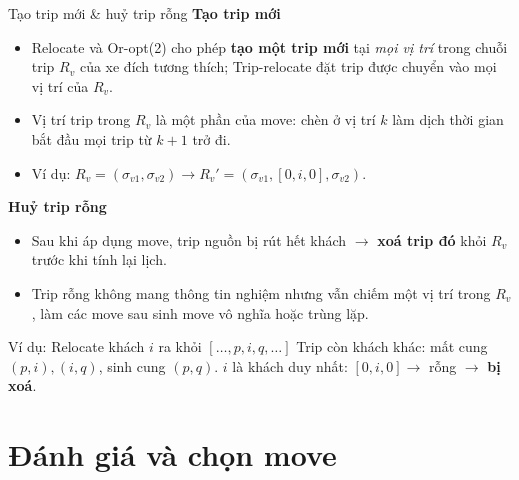\documentclass[aspectratio=169]{beamer}
\newcommand{\hl}[1]{\textcolor{blue!60!black}{\textbf{#1}}}
\begin{document}
\begin{frame}{Tạo trip mới \& huỷ trip rỗng}
  \small
  \textbf{Tạo trip mới}
  \begin{itemize}
    \item Relocate và Or-opt(2) cho phép \hl{tạo một trip mới} tại \emph{mọi vị trí} trong chuỗi trip $R_v$ của xe đích tương thích; Trip-relocate đặt trip được chuyển vào mọi vị trí của $R_v$.
    \item Vị trí trip trong $R_v$ là một phần của move: chèn ở vị trí $k$ làm dịch thời gian bắt đầu mọi trip từ $k{+}1$ trở đi.
    \item Ví dụ: $R_v = (\sigma_{v1}, \sigma_{v2}) \to R_v' = (\sigma_{v1}, [0,i,0], \sigma_{v2})$.
  \end{itemize}

  \vspace{1mm}
  \textbf{Huỷ trip rỗng}
  \begin{itemize}
    \item Sau khi áp dụng move, trip nguồn bị rút hết khách $\to$ \hl{xoá trip đó} khỏi $R_v$ trước khi tính lại lịch.
    \item Trip rỗng không mang thông tin nghiệm nhưng vẫn chiếm một vị trí trong $R_v$, làm các move sau sinh move vô nghĩa hoặc trùng lặp.
  \end{itemize}

  \begin{alertblock}{Ví dụ: Relocate khách $i$ ra khỏi $[\ldots,p,i,q,\ldots]$}
    \small Trip còn khách khác: mất cung $(p,i),(i,q)$, sinh cung $(p,q)$. \quad $i$ là khách duy nhất: $[0,i,0] \to$ rỗng $\to$ \hl{bị xoá}.
  \end{alertblock}
\end{frame}

\section{Đánh giá và chọn move}
\end{document}
